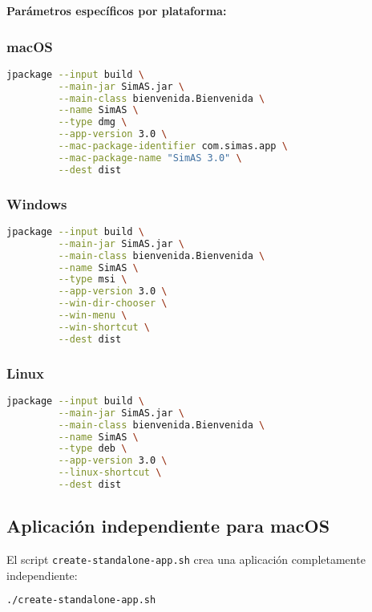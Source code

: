 \textbf{Parámetros específicos por plataforma:}

\subsubsection{macOS}
\begin{lstlisting}[language=bash, caption=Configuración para macOS]
jpackage --input build \
         --main-jar SimAS.jar \
         --main-class bienvenida.Bienvenida \
         --name SimAS \
         --type dmg \
         --app-version 3.0 \
         --mac-package-identifier com.simas.app \
         --mac-package-name "SimAS 3.0" \
         --dest dist
\end{lstlisting}

\subsubsection{Windows}
\begin{lstlisting}[language=bash, caption=Configuración para Windows]
jpackage --input build \
         --main-jar SimAS.jar \
         --main-class bienvenida.Bienvenida \
         --name SimAS \
         --type msi \
         --app-version 3.0 \
         --win-dir-chooser \
         --win-menu \
         --win-shortcut \
         --dest dist
\end{lstlisting}

\subsubsection{Linux}
\begin{lstlisting}[language=bash, caption=Configuración para Linux]
jpackage --input build \
         --main-jar SimAS.jar \
         --main-class bienvenida.Bienvenida \
         --name SimAS \
         --type deb \
         --app-version 3.0 \
         --linux-shortcut \
         --dest dist
\end{lstlisting}

\subsection{Aplicación independiente para macOS}

El script \texttt{create-standalone-app.sh} crea una aplicación completamente independiente:

\begin{lstlisting}[language=bash, caption=Creación de aplicación independiente]
./create-standalone-app.sh
\end{lstlisting}

